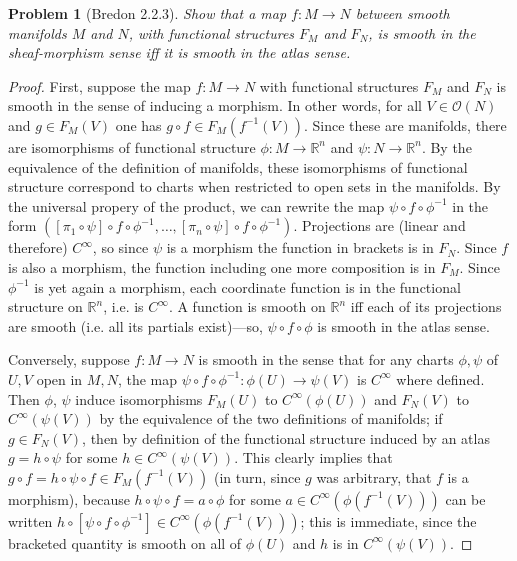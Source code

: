 \documentclass{article}
\newtheorem{plm}{Problem}
\begin{document}
\begin{plm}[Bredon 2.2.3]
  Show that a map $f: M \to N$ between smooth manifolds $M$ and $N$, with functional structures $F_{M}$ and $F_{N}$,
  is smooth in the sheaf-morphism sense iff it is smooth in the atlas sense.
\end{plm}

\begin{proof}
  First, suppose the map $f: M \to N$ with functional structures $F_{M}$ and $F_{N}$ is smooth in the sense of inducing a morphism.
  In other words, for all $V \in \mathcal{O}(N)$ and $g \in F_{M}(V)$ one has $g \circ f \in F_{M}(f^{-1}(V))$.
  Since these are manifolds, there are isomorphisms of functional structure $\phi: M \to \mathbb{R}^{n}$ and $\psi: N \to \mathbb{R}^{n}$.
  By the equivalence of the definition of manifolds, these isomorphisms of functional structure correspond to charts
  when restricted to open sets in the manifolds.
  By the universal propery of the product, we can rewrite the map $\psi \circ f \circ \phi^{-1}$ in the form
  $([\pi_{1} \circ \psi] \circ f \circ \phi^{-1}, \ldots, [\pi_{n} \circ \psi]  \circ f \circ \phi^{-1})$.
  Projections are (linear and therefore) $C^{\infty}$, so since $\psi$ is a morphism the function in brackets is in $F_{N}$.
  Since $f$ is also a morphism, the function including one more composition is in $F_{M}$.
  Since $\phi^{-1}$ is yet again a morphism, each coordinate function is in the functional structure on $\mathbb{R}^{n}$, i.e. is $C^{\infty}$.
  A function is smooth on $\mathbb{R}^{n}$ iff each of its projections are smooth (i.e. all its partials exist)---so,
  $\psi \circ f \circ \phi$ is smooth in the atlas sense.

  Conversely, suppose $f : M \to N$ is smooth in the sense that for any charts $\phi, \psi$ of $U, V$ open in $M, N$, the map
  $\psi \circ f \circ \phi^{-1}: \phi(U) \to \psi(V)$ is $C^{\infty}$ where defined.
  Then $\phi$, $\psi$ induce isomorphisms $F_{M}(U)$ to $C^{\infty}(\phi(U))$ and $F_{N}(V)$ to $C^{\infty}(\psi(V))$
  by the equivalence of the two definitions of manifolds; if $g \in F_{N}(V)$, then by definition of the functional structure induced by an atlas
  $g = h \circ \psi$ for some $h \in C^{\infty}(\psi(V))$.
  This clearly implies that $g \circ f = h \circ \psi \circ f \in F_{M}(f^{-1}(V))$  (in turn, since $g$ was arbitrary, that $f$ is a morphism),
  because $h \circ \psi \circ f = a \circ \phi$ for some $a \in C^{\infty}(\phi(f^{-1}(V)))$
  can be written $h \circ [\psi \circ f \circ \phi^{-1}] \in C^{\infty}(\phi(f^{-1}(V)))$;
  this is immediate, since the bracketed quantity is smooth on all of $\phi(U)$ and $h$ is in $C^{\infty}(\psi(V))$.
\end{proof}
\end{document}
